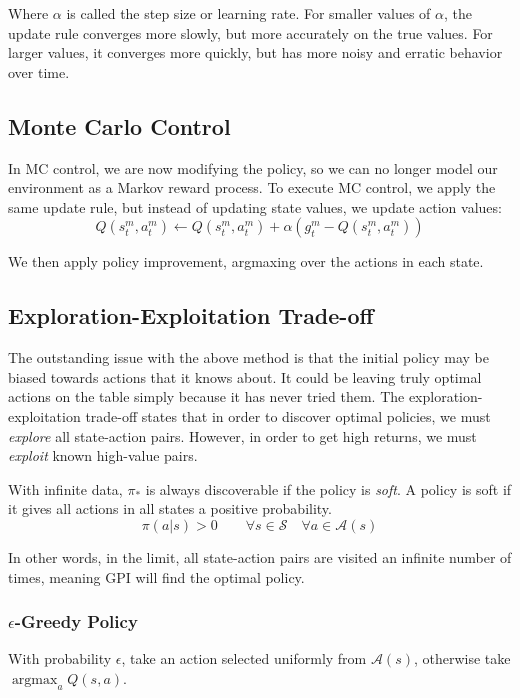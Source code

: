\documentclass{article}
\DeclareMathOperator*{\argmax}{argmax}
\begin{document}
Where $\alpha$ is called the step size or learning rate. For smaller values of $\alpha$, the update rule converges more slowly, but more accurately
on the true values. For larger values, it converges more quickly, but has more noisy and erratic behavior over time. 

\subsection{Monte Carlo Control}
\label{sec:mc-control}
In MC control, we are now modifying the policy, so we can no longer model our environment as a Markov reward process. To execute MC control, 
we apply the same update rule, but instead of updating state values, we update action values:
\begin{equation}
  Q(s_t^m, a_t^m) \leftarrow Q(s_t^m, a_t^m) + \alpha (g_t^m - Q(s_t^m, a_t^m))
\end{equation}

We then apply policy improvement, argmaxing over the actions in each state.

\subsection{Exploration-Exploitation Trade-off}
The outstanding issue with the above method is that the initial policy may be biased towards actions that it knows about.
It could be leaving truly optimal actions on the table simply because it has never tried them. The exploration-exploitation
trade-off states that in order to discover optimal policies, we must \emph{explore} all state-action pairs. However, in order to get
high returns, we must \emph{exploit} known high-value pairs. 

With infinite data, $\pi_*$ is always discoverable if the policy is \emph{soft}. A policy is soft if it gives all actions in all states
a positive probability.
\begin{equation}
  \pi(a|s) > 0 \qquad \forall s \in \mathcal{S} \quad \forall a \in \mathcal{A}(s)
\end{equation}

In other words, in the limit, all state-action pairs are visited an infinite number of times, meaning GPI will find the optimal policy.

\subsubsection{$\epsilon$-Greedy Policy}
With probability $\epsilon$, take an action selected uniformly from $\mathcal{A}(s)$, otherwise take $\argmax_a Q(s,a)$.
\end{document}

